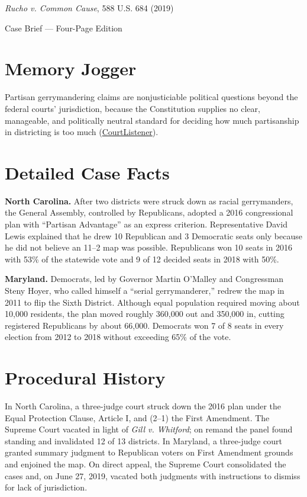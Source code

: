 \documentclass[12pt]{article}
\begin{document}
\begin{center}
{\LARGE \textit{Rucho v. Common Cause}, 588 U.S. 684 (2019)\par}
\vspace{0.8em}
{\large Case Brief --- Four-Page Edition\par}
\end{center}
\vspace{1em}

\section{Memory Jogger}

Partisan gerrymandering claims are nonjusticiable political questions beyond the federal courts' jurisdiction, because the Constitution supplies no clear, manageable, and politically neutral standard for deciding how much partisanship in districting is too much (\href{https://www.courtlistener.com/opinion/4633469/rucho-v-common-cause/}{CourtListener}).

\section{Detailed Case Facts}

\textbf{North Carolina.} After two districts were struck down as racial gerrymanders, the General Assembly, controlled by Republicans, adopted a 2016 congressional plan with ``Partisan Advantage'' as an express criterion. Representative David Lewis explained that he drew 10 Republican and 3 Democratic seats only because he did not believe an 11--2 map was possible. Republicans won 10 seats in 2016 with 53\% of the statewide vote and 9 of 12 decided seats in 2018 with 50\%.

\textbf{Maryland.} Democrats, led by Governor Martin O'Malley and Congressman Steny Hoyer, who called himself a ``serial gerrymanderer,'' redrew the map in 2011 to flip the Sixth District. Although equal population required moving about 10,000 residents, the plan moved roughly 360,000 out and 350,000 in, cutting registered Republicans by about 66,000. Democrats won 7 of 8 seats in every election from 2012 to 2018 without exceeding 65\% of the vote.

\section{Procedural History}

In North Carolina, a three-judge court struck down the 2016 plan under the Equal Protection Clause, Article I, and (2--1) the First Amendment. The Supreme Court vacated in light of \textit{Gill v. Whitford}; on remand the panel found standing and invalidated 12 of 13 districts. In Maryland, a three-judge court granted summary judgment to Republican voters on First Amendment grounds and enjoined the map. On direct appeal, the Supreme Court consolidated the cases and, on June 27, 2019, vacated both judgments with instructions to dismiss for lack of jurisdiction.
\end{document}
